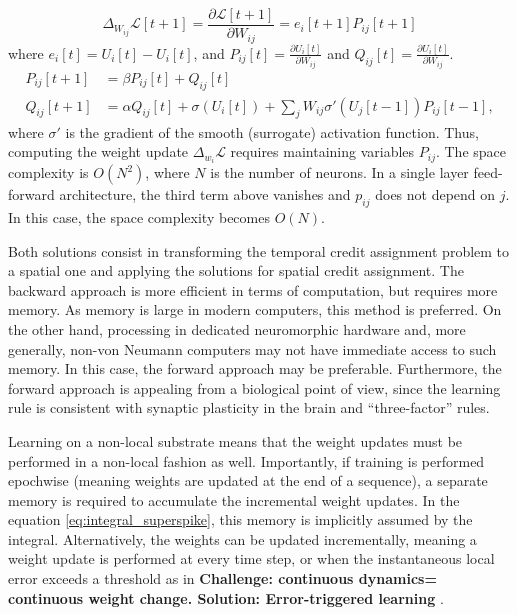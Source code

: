 \documentclass[journal,onecolumn,11pt]{IEEEtran}
\begin{document}
\[
\Delta_{W_{ij}} \mathcal{L}[t+1] = \frac{\partial \mathcal{L}[t+1]}{\partial W_{ij}} = e_i[t+1] P_{ij}[t+1]
\]
where $e_i[t] = U_i[t]-\hat{U_i}[t]$, and $P_{ij}[t] = \frac{\partial U_i[t]} {\partial W_{ij}}$ and $Q_{ij}[t] = \frac{\partial U_i[t]} {\partial W_{ij}}$.
\[
\begin{split}
 P_{ij}[t+1] &= \beta P_{ij}[t] + Q_{ij}[t]\\
 Q_{ij}[t+1] &= \alpha Q_{ij}[t] + \sigma(U_i[t]) + \sum_j W_{ij} \sigma'(U_j[t-1]) P_{ij}[t-1],
\end{split}
\]  
where $\sigma'$ is the gradient of the smooth (surrogate) activation function.
Thus, computing the weight update $\Delta_{w_i} \mathcal{L}$ requires maintaining variables $P_{ij}$. The space complexity is $O(N^2)$, where $N$ is the number of neurons. In a single layer feed-forward architecture, the third term above vanishes and $p_{ij}$ does not depend on $j$. In this case, the space complexity becomes $O(N)$. 

Both solutions consist in transforming the temporal credit assignment problem to a spatial one and applying the solutions for spatial credit assignment. The backward approach is more efficient in terms of computation, but requires more memory. As memory is large in modern computers, this method is preferred. On the other hand, processing in dedicated neuromorphic hardware and, more generally, non-von Neumann computers may not have immediate access to such memory. In this case, the forward approach may be preferable. Furthermore, the forward approach is appealing from a biological point of view, since the learning rule is consistent with synaptic plasticity in the brain and ``three-factor'' rules.

Learning on a non-local substrate means that the weight updates must be performed in a non-local fashion as well. Importantly, if training is performed epochwise (meaning weights are updated at the end of a sequence), a separate memory is required to accumulate the incremental weight updates. In the equation \ref{eq:integral_superspike}, this memory is implicitly assumed by the integral. Alternatively, the weights can be updated incrementally, meaning a weight update is performed at every time step, or when the instantaneous local error exceeds a threshold as in 
\textbf{Challenge: continuous dynamics= continuous weight change. Solution: Error-triggered learning} \cite{Neftci18_datapowe}.
\end{document}
